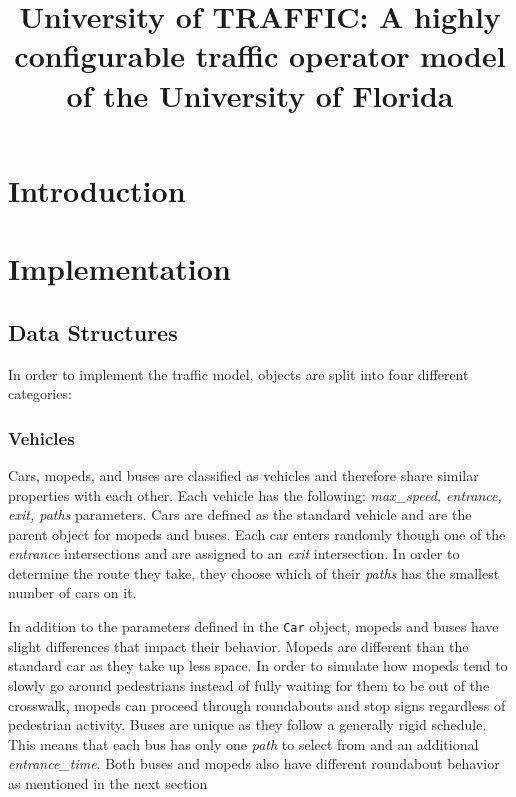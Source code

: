 \documentclass[conference]{IEEEtran}
\begin{document}
\title{University of TRAFFIC: A highly configurable traffic operator model of the University of Florida}


\author{\IEEEauthorblockN{\textcolor{uf_blue}{Andres Espinosa}}
\IEEEauthorblockA{\textcolor{uf_orange}{Industrial and Systems Engineering}\\
\textcolor{uf_orange}{University of Florida}\\
\textcolor{uf_orange}{andresespinosa@ufl.edu}}
}

\maketitle


\begin{abstract}


\end{abstract}

\IEEEpeerreviewmaketitle



\section{Introduction}






\section{Implementation}

\subsection{Data Structures}
In order to implement the traffic model, objects are split into four different categories:
\subsubsection{Vehicles}
Cars, mopeds, and buses are classified as vehicles and therefore share similar properties with each other. 
Each vehicle has the following: \textit{max\_speed, entrance, exit, paths} parameters. 
Cars are defined as the standard vehicle and are the parent object for mopeds and buses.
Each car enters randomly though one of the \textit{entrance} intersections and are assigned to an \textit{exit} intersection.
In order to determine the route they take, they choose which of their \textit{paths} has the smallest number of cars on it.

In addition to the parameters defined in the \texttt{Car} object, mopeds and buses have slight differences that impact their behavior.
Mopeds are different than the standard car as they take up less space. 
In order to simulate how mopeds tend to slowly go around pedestrians 
instead of fully waiting for them to be out of the crosswalk, 
mopeds can proceed through roundabouts and stop signs regardless of pedestrian activity.
Buses are unique as they follow a generally rigid schedule. 
This means that each bus has only one \textit{path} to select from and an additional \textit{entrance\_time}.
Both buses and mopeds also have different roundabout behavior as mentioned in the next section
\end{document}
